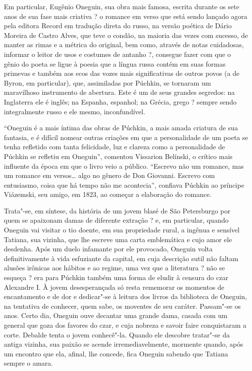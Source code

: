 Em particular, Eugênio Oneguin, sua obra mais famosa, escrita durante os
sete anos de sua fase mais criativa ? o romance em verso que está sendo
lançado agora pela editora Record em tradução direta do russo, na versão
poética de Dário Moreira de Castro Alves, que teve o condão, na maioria
das vezes com sucesso, de manter as rimas e a métrica do original, bem
como, através de notas cuidadosas, informar o leitor de usos e costumes
de antanho ?, consegue fazer com que o gênio do poeta se ligue à poesia
que a língua russa contém em suas formas primevas e também aos ecos das
vozes mais significativas de outros povos (a de Byron, em particular),
que, assimiladas por Púchkin, se tornaram um maravilhoso instrumento de
abertura. Este é um de seus grandes segredos: na Inglaterra ele é
inglês; na Espanha, espanhol; na Grécia, grego ? sempre sendo
integralmente russo e ele mesmo, inconfundível.

``Oneguin é a mais íntima das obras de Púchkin, a mais amada criatura de
sua fantasia, e é difícil nomear outras criações em que a personalidade
de um poeta se tenha refletido com tanta felicidade, luz e clareza como
a personalidade de Púchkin se refletiu em Oneguin'', comentou Vissarion
Belínski, o crítico mais influente da época em que o livro veio a
público. ``Escrevo não um romance, mas um romance em versos\ldots{} algo no
gênero de Don Giovanni. Escrevo com entusiasmo, coisa que há tempo não
me acontecia'', confiava Púchkin ao príncipe Viázemski, seu amigo, em
1823, ao começar a elaboração do romance.

Trata"-se, em síntese, da história de um jovem blasé de São Petersburgo
por quem se apaixonam damas de diferente extração ? e, em particular,
quando Oneguin vai visitar o tio doente, em sua propriedade rural, a
ingênua e sensível Tatiana, sua vizinha, que lhe escreve uma carta
emblemática e cujo amor ele desdenha. Após um duelo infamante por ele
provocado, Oneguin volta definitivamente à vida esfuziante da capital,
em cuja descrição sutil não faltam alusões irônicas aos hábitos e ao
regime, uma vez que a literatura ? não se esqueça ? era para Púchkin
também uma forma de eludir à censura do czar Alexandre I. À jovem
desesperançada só resta rememorar os momentos de encantamento e de dor e
dedicar"-se à leitura dos livros da biblioteca de Oneguin, na tentativa
de conhecer, quem sabe, os moventes de seu caráter. Passam"-se os anos.
Certo dia, Oneguin ouve decantar uma grande dama, casada com um general
que goza dos favores do czar, e cuja nobreza e savoir faire conquistaram
a corte. Debalde tenta o jovem conhecê"-la. Quando ele descobre tratar"-se
da antiga vizinha, sua paixão se acende irremediavelmente, mormente
quando, após um encontro que ela, afinal, lhe concede, fica Oneguin
sabendo que Tatiana sempre o amara.

